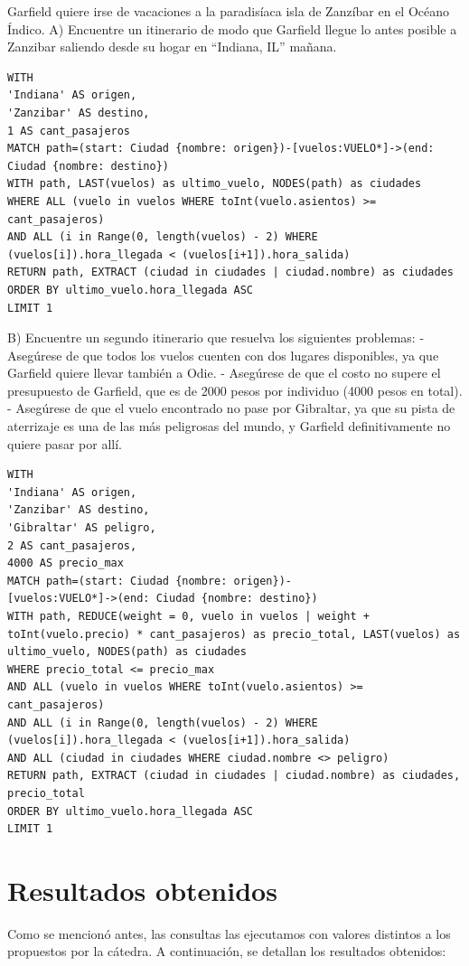 \documentclass[a4paper,11pt]{article}
\begin{document}
Garfield quiere irse de vacaciones a la paradisíaca isla de Zanzíbar en el Océano Índico.
A) Encuentre un itinerario de modo que Garfield llegue lo antes posible a Zanzibar saliendo desde su hogar en “Indiana, IL” mañana.
\begin{lstlisting}[frame=single]
WITH
'Indiana' AS origen,
'Zanzibar' AS destino,
1 AS cant_pasajeros
MATCH path=(start: Ciudad {nombre: origen})-[vuelos:VUELO*]->(end:
Ciudad {nombre: destino})
WITH path, LAST(vuelos) as ultimo_vuelo, NODES(path) as ciudades
WHERE ALL (vuelo in vuelos WHERE toInt(vuelo.asientos) >=
cant_pasajeros)
AND ALL (i in Range(0, length(vuelos) - 2) WHERE 
(vuelos[i]).hora_llegada < (vuelos[i+1]).hora_salida)
RETURN path, EXTRACT (ciudad in ciudades | ciudad.nombre) as ciudades
ORDER BY ultimo_vuelo.hora_llegada ASC
LIMIT 1
\end{lstlisting}

B) Encuentre un segundo itinerario que resuelva los siguientes problemas:
- Asegúrese de que todos los vuelos cuenten con dos lugares disponibles, ya que Garfield quiere llevar también a Odie.
- Asegúrese de que el costo no supere el presupuesto de Garfield, que es de 2000 pesos por individuo (4000 pesos en total).
- Asegúrese de que el vuelo encontrado no pase por Gibraltar, ya que su pista de aterrizaje es una de las más peligrosas del mundo, y Garfield definitivamente no quiere pasar por allí.
\newpage
\begin{lstlisting}[frame=single]
WITH
'Indiana' AS origen,
'Zanzibar' AS destino,
'Gibraltar' AS peligro,
2 AS cant_pasajeros,
4000 AS precio_max
MATCH path=(start: Ciudad {nombre: origen})-
[vuelos:VUELO*]->(end: Ciudad {nombre: destino})
WITH path, REDUCE(weight = 0, vuelo in vuelos | weight +
toInt(vuelo.precio) * cant_pasajeros) as precio_total, LAST(vuelos) as
ultimo_vuelo, NODES(path) as ciudades
WHERE precio_total <= precio_max
AND ALL (vuelo in vuelos WHERE toInt(vuelo.asientos) >=
cant_pasajeros)
AND ALL (i in Range(0, length(vuelos) - 2) WHERE
(vuelos[i]).hora_llegada < (vuelos[i+1]).hora_salida)
AND ALL (ciudad in ciudades WHERE ciudad.nombre <> peligro)
RETURN path, EXTRACT (ciudad in ciudades | ciudad.nombre) as ciudades,
precio_total
ORDER BY ultimo_vuelo.hora_llegada ASC
LIMIT 1
\end{lstlisting}

\newpage
\section*{Resultados obtenidos}
Como se mencionó antes, las consultas las ejecutamos con valores distintos a los propuestos por la cátedra.
A continuación, se detallan los resultados obtenidos:
\end{document}
